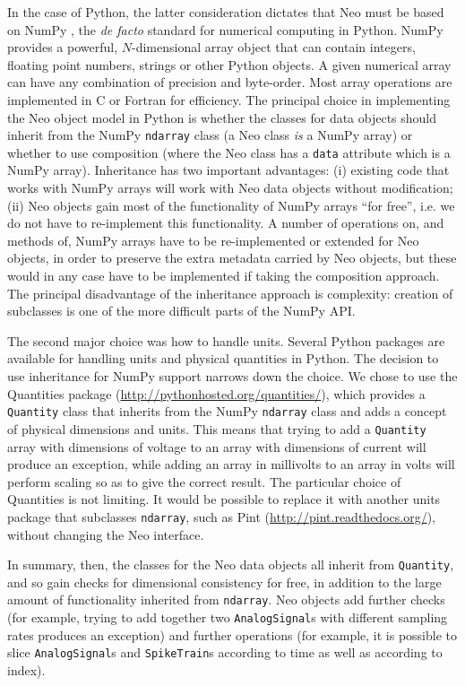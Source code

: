 \documentclass{frontiers}
\newcommand{\latin}[1]{\textit{#1}}
\begin{document}
In the case of Python, the latter consideration dictates that Neo must be based on NumPy \citep{Oliphant2007}, the \latin{de facto} standard for numerical computing in Python.
NumPy provides a powerful, $N$-dimensional array object that can contain integers, floating point numbers, strings or other Python objects.
A given numerical array can have any combination of precision and byte-order.
Most array operations are implemented in C or Fortran for efficiency.
The principal choice in implementing the Neo object model in Python is whether the classes for data objects should inherit from the NumPy \lstinline`ndarray` class (a Neo class \emph{is} a NumPy array) or whether to use composition (where the Neo class has a \lstinline`data` attribute which is a NumPy array).
Inheritance has two important advantages:
(i) existing code that works with NumPy arrays will work with Neo data objects without modification;
(ii) Neo objects gain most of the functionality of NumPy arrays ``for free'', i.e. we do not have to re-implement this functionality. 
A number of operations on, and methods of, NumPy arrays have to be re-implemented or extended for Neo objects, in order to preserve the extra metadata carried by Neo objects, but these would in any case have to be implemented if taking the composition approach.
The principal disadvantage of the inheritance approach is complexity: creation of subclasses is one of the more difficult parts of the NumPy API.

The second major choice was how to handle units.
Several Python packages are available for handling units and physical quantities in Python.
The decision to use inheritance for NumPy support narrows down the choice.
We chose to use the Quantities package (\url{http://pythonhosted.org/quantities/}), which provides a \lstinline`Quantity` class that inherits from the NumPy \lstinline`ndarray` class and adds a concept of physical dimensions and units.
This means that trying to add a \lstinline`Quantity` array with dimensions of voltage to an array with dimensions of current will produce an exception, while adding an array in millivolts to an array in volts will perform scaling so as to give the correct result.
The particular choice of Quantities is not limiting.
It would be possible to replace it with another units package that subclasses \lstinline`ndarray`, such as Pint (\url{http://pint.readthedocs.org/}), without changing the Neo interface.

In summary, then, the classes for the Neo data objects all inherit from \lstinline`Quantity`, and so gain checks for dimensional consistency for free, in addition to the large amount of functionality inherited from \lstinline`ndarray`.
Neo objects add further checks (for example, trying to add together two \lstinline`AnalogSignal`s with different sampling rates produces an exception) and further operations (for example, it is possible to slice \lstinline`AnalogSignal`s and \lstinline`SpikeTrain`s according to time as well as according to index).
\end{document}
